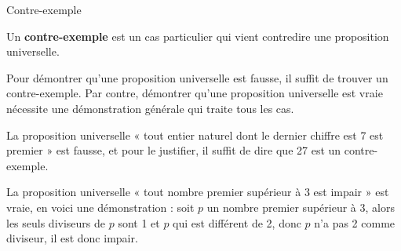 \begin{pageCours}
\begin{minipage}{0.5\linewidth}
\begin{DefTQ}{Contre-exemple}{}

Un \textbf{contre-exemple} est un cas particulier qui vient contredire une proposition universelle. 
\end{DefTQ}


\begin{Mt} 
  Pour démontrer qu'une proposition universelle est fausse, il suffit
  de trouver un contre-exemple. Par contre, démontrer qu'une proposition
  universelle est vraie nécessite une démonstration générale qui traite tous
  les cas.
\end{Mt}




\end{minipage}
\begin{minipage}{0.5\linewidth}


\begin{Ex}
  La proposition universelle « tout entier naturel dont le dernier chiffre est
  7 est premier » est fausse, et pour le justifier, il suffit
  de dire que 27 est un contre-exemple.

  La proposition universelle « tout nombre premier supérieur à 3 est impair »
  est vraie, en voici une démonstration : soit $p$ un nombre
  premier supérieur à 3, alors les seuls diviseurs de $p$ sont 1 et $p$
  qui est différent de 2, donc $p$ n'a pas 2 comme diviseur, il est donc
  impair.
\end{Ex}


\end{minipage}




\end{pageCours} 
